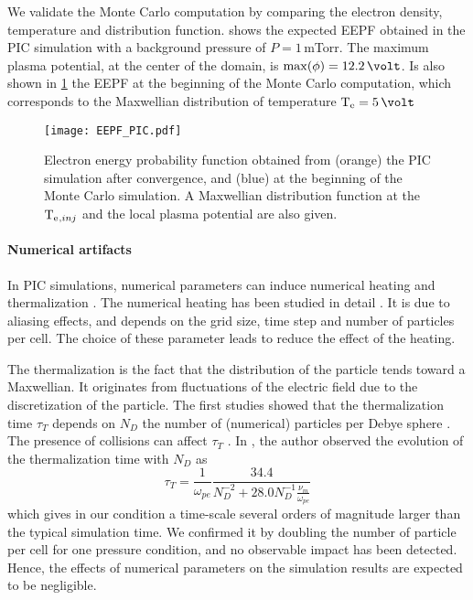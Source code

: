     We validate the Monte Carlo computation by comparing the electron density, temperature and distribution function.
     shows the expected EEPF obtained in the \ac{PIC} simulation with a background pressure of $P=1$\,mTorr.
    The maximum plasma potential, at the center of the domain, is $\max(\phi)=12.2\,\volt$.
    Is also shown in \cref{fig-EEPF_start_end} the EEPF at the beginning of the Monte Carlo computation, which corresponds to the Maxwellian distribution of temperature $\Te=5\,\volt$

    \begin{figure}[!hbt]
      \centering
      \texttt{[image: EEPF\_PIC.pdf]}
      \caption{Electron energy probability function obtained from (orange) the PIC simulation after convergence, and (blue) at the beginning of the Monte Carlo simulation. A Maxwellian distribution function at the $\mathrm{T_e}{}_{,inj}$ and the local plasma potential are also given.}
      \label{fig-EEPF_start_end}
    \end{figure}

    \paragraph{Numerical artifacts \\}
    In PIC simulations, numerical parameters can induce numerical heating and thermalization \citep{lai2014}.
    The numerical heating has been studied in detail \citep{birdsall1991}.
    It is due to aliasing effects, and depends on the grid size, time step and number of particles per cell.
    The choice of these parameter leads to reduce the effect of the heating.

    The thermalization is the fact that the distribution of the particle tends toward a Maxwellian.
    It originates from fluctuations of the electric field due to the discretization of the particle.
    The first studies showed that the thermalization time $\tau_T$ depends on $N_D$ the number of (numerical) particles per Debye sphere \citep{dawson1964,montgomery1970}.
    The presence of collisions can affect $\tau_T$  \citep{turner2006,lai2014}.
    In \citet{turner2006}, the author observed the evolution of the thermalization time with $N_D$ as
    \begin{equation} \label{eq-taut}
      \tau_T = \frac{1}{\omega_{pe}} \frac{34.4}{N_D^{-2} + 28.0 N_D^{-1} \frac{\nu_m}{\omega_{pe}}}
    \end{equation}
    which gives in our condition a time-scale several orders of magnitude larger than the typical simulation time.
    We confirmed it by doubling the number of particle per cell for one pressure condition, and no observable impact has been detected.
    Hence, the effects of numerical parameters on the simulation results are expected to be negligible.

